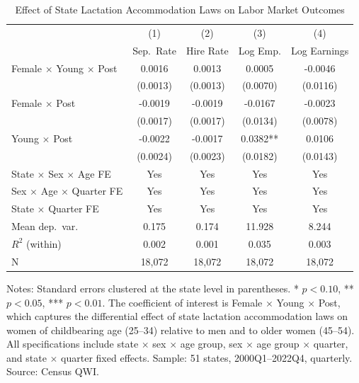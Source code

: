 \begin{table}[H]
\centering
\caption{Effect of State Lactation Accommodation Laws on Labor Market Outcomes}
\begin{threeparttable}
\begin{tabular}{lcccc}
\toprule
 & (1) & (2) & (3) & (4) \\
 & Sep.\ Rate & Hire Rate & Log Emp. & Log Earnings \\
\midrule
Female $\times$ Young $\times$ Post & 0.0016 & 0.0013 & 0.0005 & -0.0046 \\
 & (0.0013) & (0.0013) & (0.0070) & (0.0116) \\
[0.5em]
Female $\times$ Post & -0.0019 & -0.0019 & -0.0167 & -0.0023 \\
 & (0.0017) & (0.0017) & (0.0134) & (0.0078) \\
[0.5em]
Young $\times$ Post & -0.0022 & -0.0017 & 0.0382** & 0.0106 \\
 & (0.0024) & (0.0023) & (0.0182) & (0.0143) \\
\midrule
State $\times$ Sex $\times$ Age FE & Yes & Yes & Yes & Yes \\
Sex $\times$ Age $\times$ Quarter FE & Yes & Yes & Yes & Yes \\
State $\times$ Quarter FE & Yes & Yes & Yes & Yes \\
Mean dep.\ var.\ & 0.175 & 0.174 & 11.928 & 8.244 \\
$R^2$ (within) & 0.002 & 0.001 & 0.035 & 0.003 \\
N & 18,072 & 18,072 & 18,072 & 18,072 \\
\bottomrule
\end{tabular}
\begin{tablenotes}[flushleft]
\small
\item Notes: Standard errors clustered at the state level in parentheses.
* $p<0.10$, ** $p<0.05$, *** $p<0.01$.
The coefficient of interest is Female $\times$ Young $\times$ Post, which captures the
differential effect of state lactation accommodation laws on women of childbearing
age (25--34) relative to men and to older women (45--54).
All specifications include state $\times$ sex $\times$ age group,
sex $\times$ age group $\times$ quarter, and state $\times$ quarter fixed effects.
Sample: 51 states, 2000Q1--2022Q4, quarterly.
Source: Census QWI.
\end{tablenotes}
\end{threeparttable}
\label{tab:main}
\end{table}
